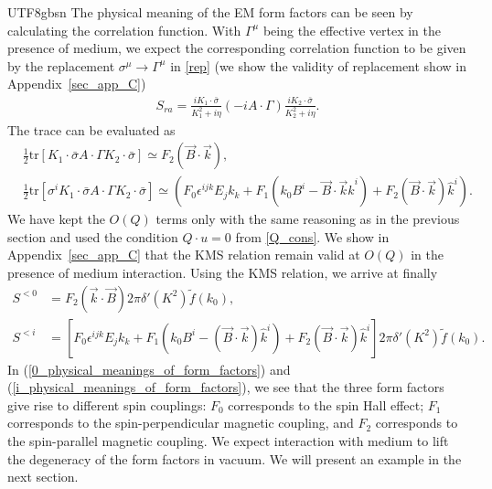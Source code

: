 \documentclass[11pt]{article}\def\baselinestretch{1.4}
\def\e{{\epsilon}}
\def\G{{\Gamma}}
\def\h{\eta}
\def\m{{\mu}}
\def\s{{\sigma}}
\def\({\left(}
\def\){\right)}
\newcommand{\tr}{\text{tr}}
\begin{document}
\begin{CJK}{UTF8}{gbsn}
The physical meaning of the EM form factors can be seen by calculating the correlation function. With $\G^\m$ being the effective vertex in the presence of medium, we expect the corresponding correlation function to be given by the replacement $\s^\m\to\G^\m$ in \eqref{rep} (we show the validity of replacement show in Appendix~\ref{sec_app_C})
\begin{align}
S_{ra}=\frac{iK_1\cdot\bar{\s}}{K_1^2+i\h}(-i A\cdot\G)\frac{iK_2\cdot\bar{\s}}{K_2^2+i\h}.
\end{align}
The trace can be evaluated as
\begin{align}\label{trace}
&\frac{1}{2}\tr[K_1\cdot\bar{\s}A\cdot\G K_2\cdot\bar{\s}]\simeq F_2(\vec{B}\cdot\vec{k}),\\ &\frac{1}{2}\tr[\s^i K_1\cdot\bar{\s}A\cdot\G K _2\cdot\bar{\s}]\simeq \(F_0\e^{ijk}E_jk_k+F_1(k_0B^i-\vec{B}\cdot \vec{k}\hat{k}^i)+F_2(\vec{B}\cdot\vec{k})\hat{k}^i\).
\end{align}
We have kept the $O(Q)$ terms only with the same reasoning as in the previous section and used the condition $Q\cdot u=0$ from \eqref{Q_cons}. We show in Appendix~\ref{sec_app_C} that the KMS relation remain valid at $O(Q)$ in the presence of medium interaction. Using the KMS relation, we arrive at finally
\begin{align}
S^{<0 } &= F_2 \left(\vec{k} \cdot \vec{B}\right) 2\pi \delta '(K^2) \tilde{f}(k_0) ,\label{0_physical_meanings_of_form_factors}\\
S^{<i } &= \left[F_0 \epsilon^{ijk}E_j k_k + F_1 \left( k_0 B^i - \left(\vec{B} \cdot \vec{k}\right)\hat{k}^i\right) + F_2 \left(\vec{B} \cdot \vec{k}\right)\hat{k}^i\right] 2\pi \delta '(K^2) \tilde{f}(k_0). \label{i_physical_meanings_of_form_factors}
\end{align}
In (\ref{0_physical_meanings_of_form_factors}) and (\ref{i_physical_meanings_of_form_factors}), we see that the three form factors give rise to different spin couplings: $F_0$ corresponds to the spin Hall effect; $F_1$ corresponds to the spin-perpendicular magnetic coupling, and $F_2$ corresponds to the spin-parallel magnetic coupling. We expect interaction with medium to lift the degeneracy of the form factors in vacuum. We will present an example in the next section.
%
%


\end{CJK}
\end{document}
